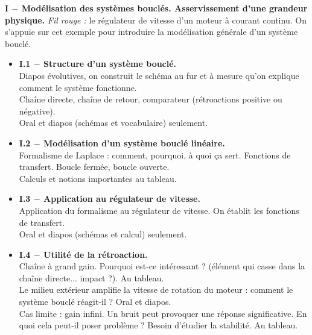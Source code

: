 \documentclass[11pt,a4paper]{report}
\begin{document}
\textbf{I $-$ Modélisation des systèmes bouclés. Asservissement d'une grandeur physique.}
\textit{Fil rouge :} le régulateur de vitesse d'un moteur à courant continu. On s'appuie sur cet exemple pour introduire la modélisation générale d'un système bouclé.
\begin{itemize}
		\item \textbf{I.1 $-$ Structure d'un système bouclé.}\\
		Diapos évolutives, on construit le schéma au fur et à mesure qu'on explique comment le système fonctionne.\\ 
		Chaîne directe, chaîne de retour, comparateur (rétroactions positive ou négative).\\
		Oral et diapos (schémas et vocabulaire) seulement.
		\item \textbf{I.2 $-$ Modélisation d'un système bouclé linéaire.}\\
		Formalisme de Laplace : comment, pourquoi, à quoi ça sert. Fonctions de transfert. Boucle fermée, boucle ouverte.\\
		Calculs et notions importantes au tableau.
		\item \textbf{I.3 $-$ Application au régulateur de vitesse.}\\
		Application du formalisme au régulateur de vitesse. On établit les fonctions de transfert.\\
		Oral et diapos (schémas et calcul) seulement.
		\item \textbf{I.4 $-$ Utilité de la rétroaction.}\\
		Chaîne à grand gain. Pourquoi est-ce intéressant ? (élément qui casse dans la chaîne directe... impact ?). Au tableau.\\
		Le milieu extérieur amplifie la vitesse de rotation du moteur : comment le système bouclé réagit-il ? Oral et diapos.\\
		Cas limite : gain infini. Un bruit peut provoquer une réponse significative. En quoi cela peut-il poser problème ? Besoin d'étudier la stabilité. 
		Au tableau.\\
\end{itemize}
\end{document}
